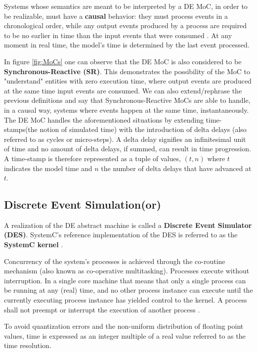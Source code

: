 \documentclass[12pt,twoside]{article}
\begin{document}
Systems whose semantics are meant to be interpreted by a DE MoC, in order to be realizable, must have a \textbf{causal} behavior: they must process events in a chronological order, 
while any output events produced by a process are required to be no earlier in time than the input events that were consumed \cite{Editor2014}.
At any moment in real time, the model's time is determined by the last event processed.

In figure \ref{fig:MoCs} one can observe that the DE MoC is also considered to be \textbf{Synchronous-Reactive (SR)}. 
This demonstrates the possibility of the MoC to "understand" entities with zero execution time, where output events are produced at the same time input events are consumed.
We can also extend/rephrase the previous definitions and say that Synchronous-Reactive MoCs are able to handle, in a causal way, systems where events happen at the same time, instantaneously.
The DE MoC handles the aforementioned situations by extending time-stamps(the notion of simulated time) with the introduction of delta delays (also referred to as cycles or micro-steps).
A delta delay signifies an infinitesimal unit of time and no amount of delta delays, if summed, can result in time progression.
A time-stamp is therefore represented as a tuple of values, $(t,n)$ where $t$ indicates the model time and $n$ the number of delta delays that have advanced at $t$.




\subsection{Discrete Event Simulation(or)}
\label{sec-4-3}
A realization of the DE abstract machine is called a \textbf{Discrete Event Simulator (DES)}.
SystemC's reference implementation of the DES is referred to as the \textbf{SystemC kernel} \cite{OpenSystemCInitiative2012}.

Concurrency of the system's processes is achieved through the co-routine mechanism (also known as co-operative multitasking). 
Processes execute without interruption. In a single core machine that means that only a single process can be running at any (real) time, 
and no other process instance can execute until the currently executing process instance has yielded control to the kernel.
A process shall not preempt or interrupt the execution of another process \cite{OpenSystemCInitiative2012}.

To avoid quantization errors and the non-uniform distribution of floating point values, time is expressed as an integer multiple of a real value referred to as the time resolution. 
\end{document}
